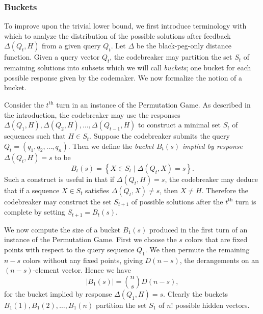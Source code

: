 \documentclass[12pt, a4paper]{article}
\newcommand{\nth}{^{\text{th}}}       %
\begin{document}
	\subsubsection{Buckets}
	To improve upon the trivial lower bound, we first introduce terminology with which to analyze the distribution of the possible solutions after feedback $\Delta(Q_t, H)$ from a given query $Q_t$. Let $\Delta$ be the black-peg-only distance function. Given a query vector $Q_t$, the codebreaker may partition the set $S_t$ of remaining solutions into subsets which we will call \textit{buckets}; one bucket for each possible response given by the codemaker. We now formalize the notion of a bucket.
	
	Consider the $t\nth$ turn in an instance of the Permutation Game. As described in the introduction, the codebreaker may use the responses $\Delta(Q_1, H), \Delta(Q_2, H), \ldots, \Delta(Q_{t-1}, H)$ to construct a minimal set $S_t$ of sequences such that $H\in S_t$. Suppose the codebreaker submits the query $Q_t = (q_1, q_2, \ldots, q_n)$. Then we define the \textit{bucket $B_t(s)$ implied by response $\Delta(Q_t, H)=s$} to be
	\begin{equation*}
		B_t(s) = \left\{X\in S_t\mid \Delta(Q_t, X) = s\right\}.
	\end{equation*}
	Such a construct is useful in that if $\Delta(Q_t, H) = s$, the codebreaker may deduce that if a sequence $X\in S_t$ satisfies $\Delta(Q_t, X)\neq s$, then $X\neq H$. Therefore the codebreaker may construct the set $S_{t+1}$ of possible solutions after the $t\nth$ turn is complete by setting $S_{t+1} = B_t(s)$.
	
	We now compute the size of a bucket $B_1(s)$ produced in the first turn of an instance of the Permutation Game. First we choose the $s$ colors that are fixed points with respect to the query sequence $Q_1$. We then permute the remaining $n-s$ colors without any fixed points, giving $D(n - s)$, the derangements on an $(n-s)$-element vector. Hence we have
	\begin{equation*}
		|B_1(s)| = \binom{n}{s}D(n-s),
	\end{equation*}
	for the bucket implied by response $\Delta(Q_1, H) = s$. Clearly the buckets $B_1(1), B_1(2), \ldots, B_1(n)$ partition the set $S_1$ of $n!$ possible hidden vectors.
	
\end{document}

